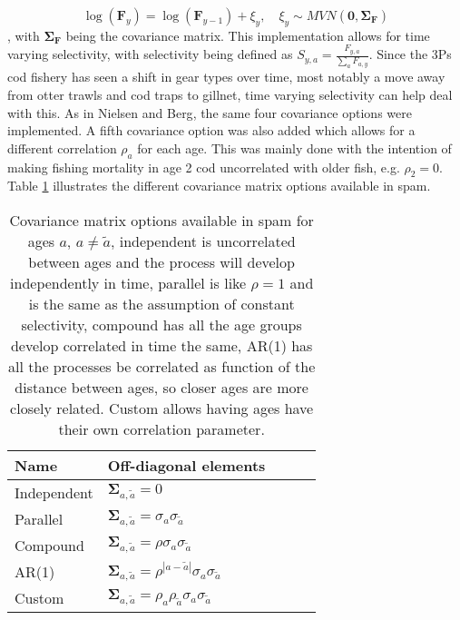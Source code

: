 \documentclass[11pt]{article}\usepackage[]{graphicx}\usepackage[]{color}
\begin{document}
\begin{equation}
  \log(\bm{F}_y) = \log(\bm{F}_{y-1}) + \xi_y, \quad \xi_y \sim MVN(\bm{0},\bm{\Sigma_F})
\end{equation}, with $\bm{\Sigma_F}$ being the covariance matrix. This implementation allows for time varying selectivity, with selectivity being defined as $S_{y,a} = \frac{F_{y,a}}{\sum_{a}F_{a,y}}$\cite{Nielsen2014Estimation-of-t}. Since the 3Ps cod fishery has seen a shift in gear types over time, most notably a move away from otter trawls and cod traps to gillnet, time varying selectivity can help deal with this. As in Nielsen and Berg\cite{Nielsen2014Estimation-of-t}, the same four covariance options were implemented. A fifth covariance option was also added which allows for a different correlation $\rho_a$ for each age. This was mainly done with the intention of making fishing mortality in age 2 cod uncorrelated with older fish, e.g. $\rho_2=0$. Table \ref{sigTab} illustrates the different covariance matrix options available in \acrshort{spam}.

\begin{table}[]
  \begin{tabular}{lllll}
    Name & Off-diagonal elements &\\ \hline
    Independent & $\bm{\Sigma}_{a,\tilde a} = 0$ &\\
    Parallel    & $\bm{\Sigma}_{a,\tilde a} = \sigma_a\sigma_{\tilde a}$                             &\\
    Compound    & $\bm{\Sigma}_{a,\tilde a} = \rho\sigma_a\sigma_{\tilde a}$                              &\\
    AR(1)       & $\bm{\Sigma}_{a,\tilde a} = \rho^{|a-\tilde a|}\sigma_a\sigma_{\tilde a}$                            & \\
    Custom      & $\bm{\Sigma}_{a,\tilde a} = \rho_a\rho_{\tilde a}\sigma_a\sigma_{\tilde a}$                             & 
  \end{tabular}
  \caption{Covariance matrix options available in \acrshort{spam} for ages $a$, $a \neq \tilde a$, independent is uncorrelated between ages and the process will develop independently in time, parallel is like $\rho=1$ and is the same as the assumption of constant selectivity, compound has all the age groups develop correlated in time the same, AR(1) has all the processes be correlated as function of the distance between ages, so closer ages are more closely related. Custom allows having ages have their own correlation parameter.}
  \label{sigTab} 
\end{table} 
\end{document}

